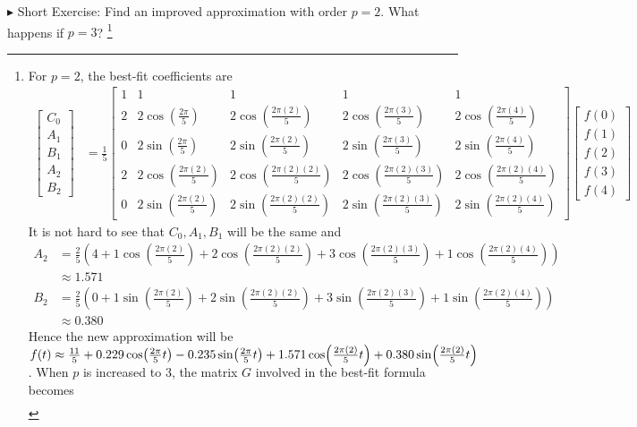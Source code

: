 $\blacktriangleright$ Short Exercise: Find an improved approximation with order $p = 2$. What happens if $p = 3$? \footnote{For $p = 2$, the best-fit coefficients are
\begin{align*}
\begin{bmatrix}
C_0 \\
A_1 \\
B_1 \\
A_2 \\
B_2
\end{bmatrix}
&= 
\frac{1}{5}
\begin{bmatrix}
1 & 1 & 1 & 1 & 1 \\
2 & 2\cos(\frac{2\pi}{5}) & 2\cos(\frac{2\pi(2)}{5}) & 2\cos(\frac{2\pi(3)}{5}) & 2\cos(\frac{2\pi(4)}{5}) \\
0 & 2\sin(\frac{2\pi}{5}) & 2\sin(\frac{2\pi(2)}{5}) & 2\sin(\frac{2\pi(3)}{5}) & 2\sin(\frac{2\pi(4)}{5}) \\
2 & 2\cos(\frac{2\pi(2)}{5}) & 2\cos(\frac{2\pi(2)(2)}{5}) & 2\cos(\frac{2\pi(2)(3)}{5}) & 2\cos(\frac{2\pi(2)(4)}{5}) \\
0 & 2\sin(\frac{2\pi(2)}{5}) & 2\sin(\frac{2\pi(2)(2)}{5}) & 2\sin(\frac{2\pi(2)(3)}{5}) & 2\sin(\frac{2\pi(2)(4)}{5})
\end{bmatrix}
\begin{bmatrix}
f(0)\\
f(1)\\
f(2)\\
f(3)\\
f(4)
\end{bmatrix}     
\end{align*}
It is not hard to see that $C_0, A_1, B_1$ will be the same and
\begin{align*}
A_2 &= \frac{2}{5} \left(4 + 1\cos(\frac{2\pi(2)}{5}) + 2\cos(\frac{2\pi(2)(2)}{5}) + 3\cos(\frac{2\pi(2)(3)}{5}) + 1\cos(\frac{2\pi(2)(4)}{5})\right) \\
&\approx 1.571 \\
B_2 &= \frac{2}{5} \left(0 + 1\sin(\frac{2\pi(2)}{5}) + 2\sin(\frac{2\pi(2)(2)}{5}) + 3\sin(\frac{2\pi(2)(3)}{5}) + 1\sin(\frac{2\pi(2)(4)}{5})\right) \\
&\approx 0.380
\end{align*}
Hence the new approximation will be $f(t) \approx \frac{11}{5} + \smash{0.229 \cos(\frac{2\pi}{5}t)} - \smash{0.235 \sin(\frac{2\pi}{5}t)} + \smash{1.571 \cos(\frac{2\pi(2)}{5}t)} + \smash{0.380 \sin(\frac{2\pi(2)}{5}t)}$. When $p$ is increased to $3$, the matrix $G$ involved in the best-fit formula becomes
\begin{align*}

\end{align*}}
